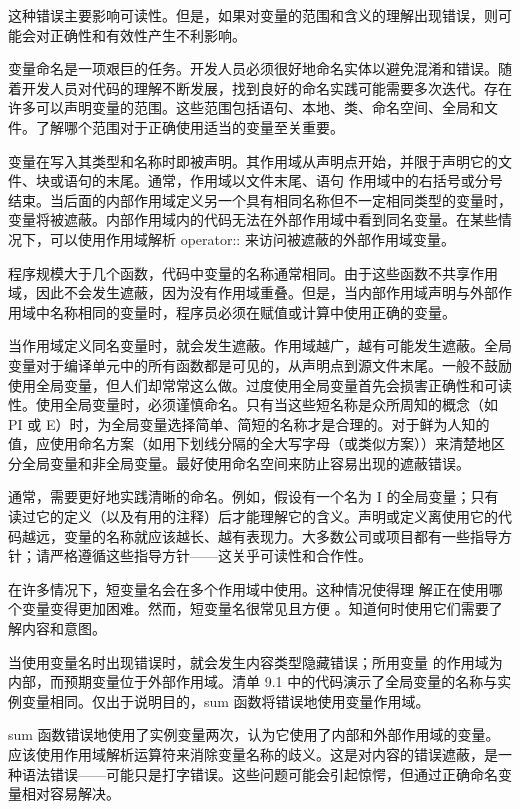 
这种错误主要影响可读性。但是，如果对变量的范围和含义的理解出现错误，则可能会对正确性和有效性产生不利影响。

变量命名是一项艰巨的任务。开发人员必须很好地命名实体以避免混淆和错误。随着开发人员对代码的理解不断发展，找到良好的命名实践可能需要多次迭代。存在许多可以声明变量的范围。这些范围包括语句、本地、类、命名空间、全局和文件。了解哪个范围对于正确使用适当的变量至关重要。

变量在写入其类型和名称时即被声明。其作用域从声明点开始，并限于声明它的文件、块或语句的末尾。通常，作用域以文件末尾、语句 作用域中的右括号或分号结束。当后面的内部作用域定义另一个具有相同名称但不一定相同类型的变量时，变量将被遮蔽。内部作用域内的代码无法在外部作用域中看到同名变量。在某些情况下，可以使用作用域解析 operator:: 来访问被遮蔽的外部作用域变量。

程序规模大于几个函数，代码中变量的名称通常相同。由于这些函数不共享作用域，因此不会发生遮蔽，因为没有作用域重叠。但是，当内部作用域声明与外部作用域中名称相同的变量时，程序员必须在赋值或计算中使用正确的变量。


当作用域定义同名变量时，就会发生遮蔽。作用域越广，越有可能发生遮蔽。全局变量对于编译单元中的所有函数都是可见的，从声明点到源文件末尾。一般不鼓励使用全局变量，但人们却常常这么做。过度使用全局变量首先会损害正确性和可读性。使用全局变量时，必须谨慎命名。只有当这些短名称是众所周知的概念（如 PI 或 E）时，为全局变量选择简单、简短的名称才是合理的。对于鲜为人知的值，应使用命名方案（如用下划线分隔的全大写字母（或类似方案））来清楚地区分全局变量和非全局变量。最好使用命名空间来防止容易出现的遮蔽错误。

通常，需要更好地实践清晰的命名。例如，假设有一个名为 I 的全局变量；只有读过它的定义（以及有用的注释）后才能理解它的含义。声明或定义离使用它的代码越远，变量的名称就应该越长、越有表现力。大多数公司或项目都有一些指导方针；请严格遵循这些指导方针——这关乎可读性和合作性。

在许多情况下，短变量名会在多个作用域中使用。这种情况使得理 解正在使用哪个变量变得更加困难。然而，短变量名很常见且方便 。知道何时使用它们需要了解内容和意图。

当使用变量名时出现错误时，就会发生内容类型隐藏错误；所用变量 的作用域为内部，而预期变量位于外部作用域。清单 9.1 中的代码演示了全局变量的名称与实例变量相同。仅出于说明目的，sum 函数将错误地使用变量作用域。

sum 函数错误地使用了实例变量两次，认为它使用了内部和外部作用域的变量。应该使用作用域解析运算符来消除变量名称的歧义。这是对内容的错误遮蔽，是一种语法错误——可能只是打字错误。这些问题可能会引起惊愕，但通过正确命名变量相对容易解决。

